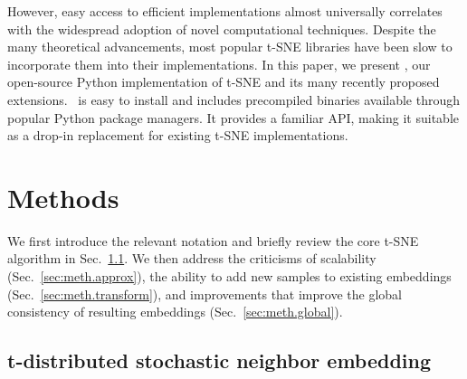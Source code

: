 \documentclass[article]{jss}
\newcommand{\opentsne}{\pkg{openTSNE}}
\begin{document}
However, easy access to efficient implementations almost universally correlates
with the widespread adoption of novel computational techniques. Despite the many
theoretical advancements, most popular t-SNE libraries have been slow to
incorporate them into their implementations. In this paper, we present \opentsne,
our open-source Python implementation of t-SNE and its many recently proposed
extensions. \opentsne\ is easy to install and includes precompiled binaries
available through popular Python package managers. It provides a familiar API,
making it suitable as a drop-in replacement for existing t-SNE implementations.




\section{Methods} \label{sec:methods}

We first introduce the relevant notation and briefly review the core t-SNE
algorithm in Sec.~\ref{sec:meth.tsne}. We then address the criticisms of
scalability (Sec.~\ref{sec:meth.approx}), the ability to add new samples to
existing embeddings (Sec.~\ref{sec:meth.transform}), and improvements that
improve the global consistency of resulting embeddings
(Sec.~\ref{sec:meth.global}).

\subsection{t-distributed stochastic neighbor embedding} \label{sec:meth.tsne}
\end{document}
